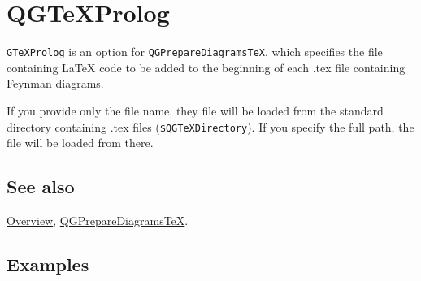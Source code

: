 \documentclass[../FeynHelpersManual.tex]{subfiles}
\begin{document}
\hypertarget{qgtexprolog}{
\section{QGTeXProlog}\label{qgtexprolog}}

\texttt{GTeXProlog} is an option for \texttt{QGPrepareDiagramsTeX},
which specifies the file containing LaTeX code to be added to the
beginning of each .tex file containing Feynman diagrams.

If you provide only the file name, they file will be loaded from the
standard directory containing .tex files (\texttt{\$QGTeXDirectory}). If
you specify the full path, the file will be loaded from there.

\subsection{See also}

\hyperlink{toc}{Overview},
\hyperlink{qgpreparediagramstex}{QGPrepareDiagramsTeX}.

\subsection{Examples}
\end{document}
